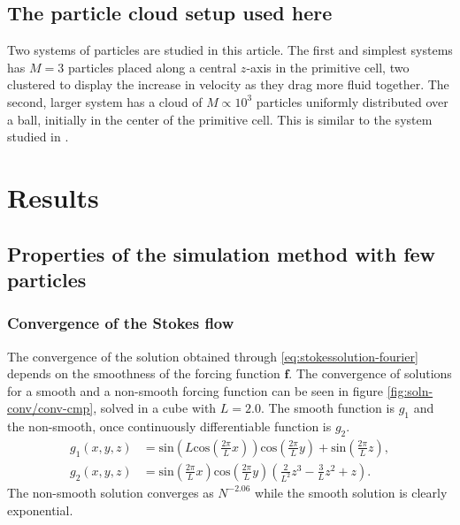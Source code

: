 \documentclass[a4paper,
twoside=false,abstract=false,numbers=noenddot,
titlepage=false,headings=small,parskip=half,version=last]{scrartcl}
\begin{document}
\subsection{The particle cloud setup used here}

Two systems of particles are studied in this article.
The first and simplest systems has $M=3$ particles placed along a central $z$-axis in the primitive cell, two clustered to display the increase in velocity as they drag more fluid together.
The second, larger system has a cloud of $M\propto 10^3$ particles uniformly distributed over a ball, initially in the center of the primitive cell. This is similar to the system studied in \cite{fallingclouds}.

\section{Results}

\subsection{Properties of the simulation method with few particles}

\subsubsection{Convergence of the Stokes flow}
The convergence of the solution obtained through \eqref{eq:stokessolution-fourier} depends on the smoothness of the forcing function $\mathbf{f}$.
The convergence of solutions for a smooth and a non-smooth forcing function can be seen in figure \ref{fig:soln-conv/conv-cmp}, solved in a cube with $L=2.0$.
The smooth function is $g_1$ and the non-smooth, once continuously differentiable function is $g_2$.
\begin{align}
g_1(x,y,z) &= \text{sin}(L\text{cos}(\frac{2\pi}{L}x))\text{cos}(\frac{2\pi}{L}y) + \text{sin}(\frac{2\pi}{L}z),\nonumber\\
g_2(x,y,z) &= \text{sin}(\frac{2\pi}{L}x)\text{cos}(\frac{2\pi}{L}y)(\frac{2}{L^2}z^3 - \frac{3}{L} z^2 + z).\nonumber
\end{align}
The non-smooth solution converges as $N^{-2.06}$ while the smooth solution is clearly exponential.

\end{document}
